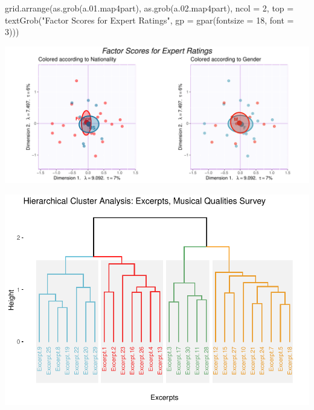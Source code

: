 \documentclass[
]{article}
\newenvironment{Shaded}{\begin{snugshade}}{\end{snugshade}}
\newcommand{\AttributeTok}[1]{\textcolor[rgb]{0.77,0.63,0.00}{#1}}
\newcommand{\DecValTok}[1]{\textcolor[rgb]{0.00,0.00,0.81}{#1}}
\newcommand{\FloatTok}[1]{\textcolor[rgb]{0.00,0.00,0.81}{#1}}
\newcommand{\FunctionTok}[1]{\textcolor[rgb]{0.00,0.00,0.00}{#1}}
\newcommand{\NormalTok}[1]{#1}
\newcommand{\StringTok}[1]{\textcolor[rgb]{0.31,0.60,0.02}{#1}}
\begin{document}
\begin{Shaded}
\begin{Highlighting}[]
\FunctionTok{grid.arrange}\NormalTok{(}\FunctionTok{as.grob}\NormalTok{(a.}\FloatTok{01.}\NormalTok{map4part), }
             \FunctionTok{as.grob}\NormalTok{(a.}\FloatTok{02.}\NormalTok{map4part), }\AttributeTok{ncol =} \DecValTok{2}\NormalTok{,}
             \AttributeTok{top =} \FunctionTok{textGrob}\NormalTok{(}\StringTok{"Factor Scores for Expert Ratings"}\NormalTok{, }
                            \AttributeTok{gp =} \FunctionTok{gpar}\NormalTok{(}\AttributeTok{fontsize =} \DecValTok{18}\NormalTok{, }\AttributeTok{font =} \DecValTok{3}\NormalTok{)))}
\end{Highlighting}
\end{Shaded}

\begin{center}\includegraphics{MusDes_Supplementary_files/figure-latex/printRVbydesign-1} \end{center}

\begin{center}\includegraphics{MusDes_Supplementary_files/figure-latex/HCA-1} \end{center}
\end{document}
